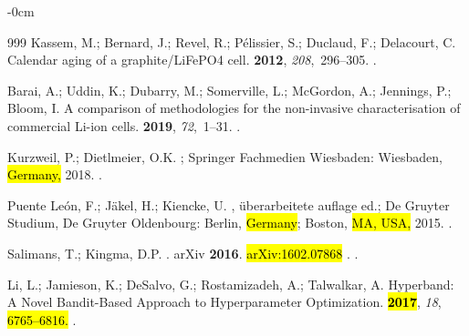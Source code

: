 \documentclass[energies,article,accept,pdftex,moreauthors]{Definitions/mdpi}
\begin{document}
\begin{adjustwidth}{-\extralength}{0cm}
\begin{thebibliography}{999}
Kassem, M.; Bernard, J.; Revel, R.; P{\'e}lissier, S.; Duclaud, F.; Delacourt,
  C.
\newblock Calendar aging of a graphite/LiFePO4 cell.
 {\bf 2012}, {\em 208},~296--305.
.

Barai, A.; Uddin, K.; Dubarry, M.; Somerville, L.; McGordon, A.; Jennings, P.;
  Bloom, I.
\newblock A comparison of methodologies for the non-invasive characterisation
  of commercial Li-ion cells.
 {\bf 2019}, {\em
  72},~1--31.
.

Kurzweil, P.; Dietlmeier, O.K.
; {Springer Fachmedien Wiesbaden}:
  Wiesbaden, \hl{Germany,} 2018.
.

{Puente Le{\'o}n}, F.; J{\"a}kel, H.; Kiencke, U.
, {\"u}berarbeitete auflage ed.; De
  Gruyter Studium, {De Gruyter Oldenbourg}: Berlin, \hl{Germany}; Boston, \hl{MA, USA, }2015.
.

Salimans, T.; Kingma, D.P.
. arXiv  \textbf{2016}. \hl{arXiv:1602.07868   }.
.

Li, L.; Jamieson, K.; DeSalvo, G.; Rostamizadeh, A.; Talwalkar, A.
\newblock Hyperband: A Novel Bandit-Based Approach to Hyperparameter
  Optimization.
 \hl{{\bf 2017}}, \emph{18},\hl{ 6765--6816.}
.



\end{thebibliography}
\end{adjustwidth}
\end{document}
